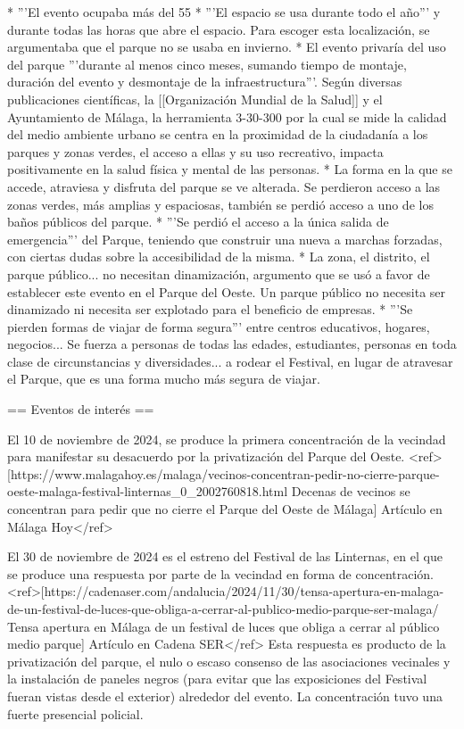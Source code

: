 * '''El evento ocupaba más del 55%
* '''El espacio se usa durante todo el año''' y durante todas las horas que abre el espacio. Para escoger esta localización, se argumentaba que el parque no se usaba en invierno.
* El evento privaría del uso del parque '''durante al menos cinco meses, sumando tiempo de montaje, duración del evento y desmontaje de la infraestructura'''. Según diversas publicaciones científicas, la [[Organización Mundial de la Salud]] y el Ayuntamiento de Málaga, la herramienta 3-30-300 por la cual se mide la calidad del medio ambiente urbano se centra en la proximidad de la ciudadanía a los parques y zonas verdes, el acceso a ellas y su uso recreativo, impacta positivamente en la salud física y mental de las personas.
* La forma en la que se accede, atraviesa y disfruta del parque se ve alterada. Se perdieron acceso a las zonas verdes, más amplias y espaciosas, también se perdió acceso a uno de los baños públicos del parque.
* '''Se perdió el acceso a la única salida de emergencia''' del Parque, teniendo que construir una nueva a marchas forzadas, con ciertas dudas sobre la accesibilidad de la misma.
* La zona, el distrito, el parque público... no necesitan dinamización, argumento que se usó a favor de establecer este evento en el Parque del Oeste. Un parque público no necesita ser dinamizado ni necesita ser explotado para el beneficio de empresas.
* '''Se pierden formas de viajar de forma segura''' entre centros educativos, hogares, negocios... Se fuerza a personas de todas las edades, estudiantes, personas en toda clase de circunstancias y diversidades... a rodear el Festival, en lugar de atravesar el Parque, que es una forma mucho más segura de viajar.

== Eventos de interés ==

El 10 de noviembre de 2024, se produce la primera concentración de la vecindad para manifestar su desacuerdo por la privatización del Parque del Oeste. <ref>[https://www.malagahoy.es/malaga/vecinos-concentran-pedir-no-cierre-parque-oeste-malaga-festival-linternas_0_2002760818.html Decenas de vecinos se concentran para pedir que no cierre el Parque del Oeste de Málaga] Artículo en Málaga Hoy</ref>

El 30 de noviembre de 2024 es el estreno del Festival de las Linternas, en el que se produce una respuesta por parte de la vecindad en forma de concentración. <ref>[https://cadenaser.com/andalucia/2024/11/30/tensa-apertura-en-malaga-de-un-festival-de-luces-que-obliga-a-cerrar-al-publico-medio-parque-ser-malaga/ Tensa apertura en Málaga de un festival de luces que obliga a cerrar al público medio parque] Artículo en Cadena SER</ref> Esta respuesta es producto de la privatización del parque, el nulo o escaso consenso de las asociaciones vecinales y la instalación de paneles negros (para evitar que las exposiciones del Festival fueran vistas desde el exterior) alrededor del evento. La concentración tuvo una fuerte presencial policial.

